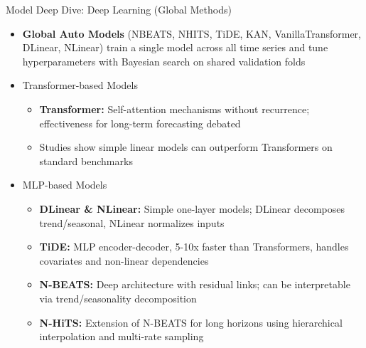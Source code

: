 \documentclass[ignorenonframetext, 9pt]{beamer}
\begin{document}
\begin{frame}{Model Deep Dive: Deep Learning (Global Methods)}
    \begin{itemize}
        \item \textbf{Global Auto Models} (NBEATS, NHITS, TiDE, KAN, VanillaTransformer, DLinear, NLinear) train a single model across all time series and tune hyperparameters with Bayesian search on shared validation folds
        \vspace{0.3cm}
        \item \alert{Transformer-based Models}
        \begin{itemize}
            \item \textbf{Transformer:} Self-attention mechanisms without recurrence; effectiveness for long-term forecasting debated
            \vspace{0.2cm}
            \item Studies show simple linear models can outperform Transformers on standard benchmarks
        \end{itemize}
        \vspace{0.3cm}
        \item \alert{MLP-based Models}
        \begin{itemize}
            \item \textbf{DLinear \& NLinear:} Simple one-layer models; DLinear decomposes trend/seasonal, NLinear normalizes inputs
            \vspace{0.2cm}
            \item \textbf{TiDE:} MLP encoder-decoder, 5-10x faster than Transformers, handles covariates and non-linear dependencies
            \vspace{0.2cm}
            \item \textbf{N-BEATS:} Deep architecture with residual links; can be interpretable via trend/seasonality decomposition
            \vspace{0.2cm}
            \item \textbf{N-HiTS:} Extension of N-BEATS for long horizons using hierarchical interpolation and multi-rate sampling
        \end{itemize}
    \end{itemize}
\end{frame}
\end{document}
